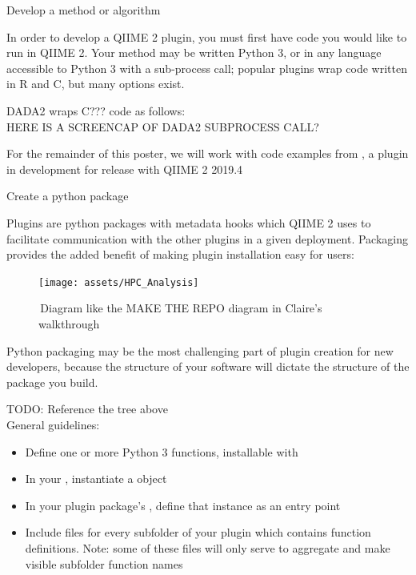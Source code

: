 \documentclass[final]{beamer}
\newlength{\colwidth}
\begin{document}
\begin{frame}[t]
\begin{columns}[t]
\begin{column}{\colwidth}
  \begin{block}{Develop a method or algorithm}

  In order to develop a QIIME 2 plugin, you must first have code you would
  like to run in QIIME 2. Your method may be written Python 3, or in any
  language accessible to Python 3 with a sub-process call; popular plugins wrap
  code written in R and C, but many options exist.
  \hfill\break

    \begin{tcolorbox}
    [width=\textwidth, colframe=blue]
      {DADA2 wraps C??? code as follows: \\
      HERE IS A SCREENCAP OF DADA2 SUBPROCESS CALL?}
    \end{tcolorbox}

  For the remainder of this poster, we will work with code examples from
  , a plugin in development for release with QIIME 2 2019.4
  \end{block}

  \begin{block}{Create a python package}

    Plugins are python packages with metadata hooks which QIIME 2 uses to facilitate
    communication with the other plugins in a given deployment. Packaging
    provides the added benefit of making plugin installation easy for users:

    \begin{figure}[tph!]
      {\texttt{[image: assets/HPC\_Analysis]}}
      \caption{\,Diagram like the MAKE THE REPO diagram in Claire's walkthrough}
      \label{fig:dada2}
    \end{figure}

    \begin{tcolorbox}
    [width=\textwidth, colframe=blue]
    {Python packaging may be the most challenging part of plugin creation
    for new developers, because the structure of your software will dictate
    the structure of the package you build. }
    \end{tcolorbox}
    TODO: Reference the tree above\\
    General guidelines:
    \begin{itemize}
      \item Define one or more Python 3 functions, installable with 
      \item In your , instantiate a  object
      \item In your plugin package's , define that instance as an entry point
      \item Include  files for every subfolder of your plugin which contains function definitions. Note: some of these 
      files will only serve to aggregate and make visible subfolder function names
    \end{itemize}
  \end{block}


\end{column}
\end{columns}
\end{frame}
\end{document}
